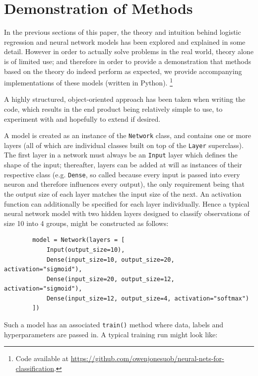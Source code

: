 \documentclass{article}[11pt]
\begin{document}
            

\section{Demonstration of Methods} \label{sec:demos}
    
    In the previous sections of this paper, the theory and intuition behind logistic regression and neural network models has been explored and explained in some detail. However in order to actually solve problems in the real world, theory alone is of limited use; and therefore in order to provide a demonstration that methods based on the theory do indeed perform as expected, we provide accompanying implementations of these models (written in Python). \footnote{Code available at \url{https://github.com/owenjonesuob/neural-nets-for-classification}.}
    
    A highly structured, object-oriented approach has been taken when writing the code, which results in the end product being relatively simple to use, to experiment with and hopefully to extend if desired.
    
    A model is created as an instance of the \texttt{Network} class, and contains one or more layers (all of which are individual classes built on top of the \texttt{Layer} superclass). The first layer in a network must always be an \texttt{Input} layer which defines the shape of the input; thereafter, layers can be added at will as instances of their respective class (e.g. \texttt{Dense}, so called because every input is passed into every neuron and therefore influences every output), the only requirement being that the output size of each layer matches the input size of the next. An activation function can additionally be specified for each layer individually. Hence a typical neural network model with two hidden layers designed to classify observations of size 10 into 4 groups, might be constructed as follows:
    
    
    \begin{verbatim}
        model = Network(layers = [
            Input(output_size=10),
            Dense(input_size=10, output_size=20, activation="sigmoid"),
            Dense(input_size=20, output_size=12, activation="sigmoid"),
            Dense(input_size=12, output_size=4, activation="softmax")
        ])
    \end{verbatim}
    
    
    Such a model has an associated \texttt{train()} method where data, labels and hyperparameters are passed in. A typical training run might look like:
    
\end{document}
